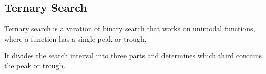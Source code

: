 \subsection*{Ternary Search}
    Ternary search is a varation of binary search that works on unimodal functions, where a function has a single peak or trough.
  
    It divides the search interval into three parts and determines which third contains the peak or trough.